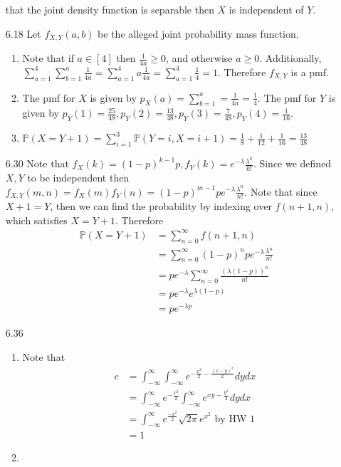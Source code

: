 \documentclass[12pt, letterpaper]{article}
\newcommand{\Pro}{\mathbb{P}}
\begin{document}
\begin{enumerate}
	that the joint density function is separable then $X$ is independent of $Y$.
	\item[6.18] Let $f_{X,Y}(a,b)$ be the alleged joint probability mass function.
	\begin{enumerate}
		\item Note that if $a \in [4]$ then $\frac{1}{4a} \geq 0$, and otherwise $a \geq 0$.  Additionally, $\sum_{a=1}^4 \sum_{b=1}^a \frac{1}{4a} = \sum_{a=1}^4 a \frac{1}{4a} = \sum_{a=1}^4 \frac{1}{4} = 1$.  Therefore $f_{X,Y}$ is a pmf.
		\item The pmf for $X$ is given by $p_X(a) = \sum_{b=1}^a = \frac{1}{4a} = \frac{1}{4}$.  The pmf for $Y$ is given by $p_Y(1) = \frac{25}{48}, p_Y(2) = \frac{13}{48}, p_Y(3) = \frac{7}{48}, p_Y(4) = \frac{1}{16}$.
		\item $\Pro(X = Y+1) = \sum_{i=1}^3 \Pro(Y=i, X=i+1) = \frac{1}{8} +\frac{1}{12} +\frac{1}{16} = \frac{13}{48}$
	\end{enumerate}	 
	\item[6.30]
	Note that $f_X(k) = (1-p)^{k-1}p, f_Y(k) = e^{-\lambda}\frac{\lambda^k}{k!}$.
	Since we defined $X,Y$ to be independent then 
	$f_{X,Y}(m,n) = f_X(m)f_Y(n) =(1-p)^{m-1}pe^{-\lambda}\frac{\lambda^n}{n!}$.
	Note that since $X+1 = Y$, then we can find the probability by indexing over  		$f(n+1,n)$, which satisfies $X=Y+1$.  Therefore 
	\begin{align*}
		\Pro(X=Y+1) &= \sum_{n=0}^\infty f(n+1,n)\\
		 &= \sum_{n=0}^\infty(1-p)^{n}pe^{-\lambda}\frac{\lambda^n}{n!}\\
		 &= pe^{-\lambda} \sum_{n=0}^\infty \frac{(\lambda(1-p))^n}{n!}\\
		 &= pe^{-\lambda} e^{\lambda(1-p)}\\
		 &= pe^{-\lambda p}
	\end{align*}		
	\item[6.36] 
	\begin{enumerate}
		\item Note that 
		\begin{align*}
			c &= \int_{-\infty}^\infty \int_{-\infty}^\infty e^{-\frac{x^2}{2}-\frac{(x-y)^2}{2}}dydx\\ &=  \int_{-\infty}^\infty e^{-\frac{x^2}{2}} \int_{-\infty}^\infty e^{xy-\frac{y^2}{2}} dy dx \\
			&= \int_{-\infty}^\infty e^\frac{-x^2}{2} \sqrt{2\pi} e^{x^2} \text{ by HW 1}\\
			&= 1
		\end{align*}
		\item \begin{align*}

\end{align*}
\end{enumerate}
\end{enumerate}
\end{document}
